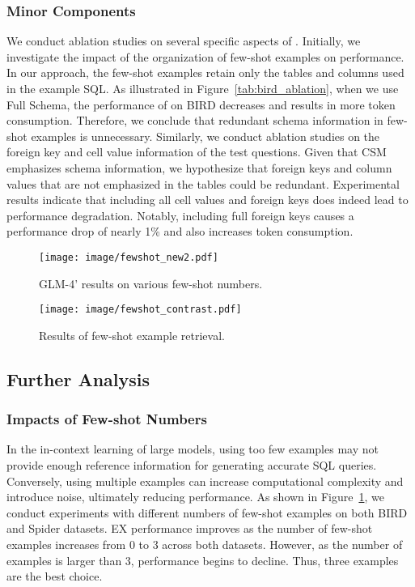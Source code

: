 

\subsubsection{Minor Components}
We conduct ablation studies on several specific aspects of \method. Initially, we investigate the impact of the organization of few-shot examples on performance. In our approach, the few-shot examples retain only the tables and columns used in the example SQL. 
As illustrated in Figure~\ref{tab:bird_ablation}, when we use Full Schema, the performance of \method on BIRD decreases and results in more token consumption. Therefore, we conclude that redundant schema information in few-shot examples is unnecessary.
Similarly, we conduct ablation studies on the foreign key and cell value information of the test questions. Given that CSM emphasizes schema information, we hypothesize that foreign keys and column values that are not emphasized in the tables could be redundant. 
Experimental results indicate that including all cell values and foreign keys does indeed lead to performance degradation. Notably, including full foreign keys causes a performance drop of nearly 1\% and also increases token consumption.

\begin{figure}[htbp]
    \centering
    \texttt{[image: image/fewshot\_new2.pdf]}
    \caption{GLM-4' results on various few-shot numbers.}
    \label{fig:fewshot_number}
    \vspace{-4mm}
\end{figure}

\begin{figure*}[htbp]
    \centering
    \texttt{[image: image/fewshot\_contrast.pdf]}
    \caption{Results of few-shot example retrieval.}
    \label{fig:aqp_case}
    \vspace{-4mm}
\end{figure*}

\subsection{Further Analysis}

\subsubsection{Impacts of Few-shot Numbers}

In the in-context learning of large models, using too few examples may not provide enough reference information for generating accurate SQL queries. Conversely, using multiple examples can increase computational complexity and introduce noise, ultimately reducing performance.
As shown in Figure~\ref{fig:fewshot_number}, we conduct experiments with different numbers of few-shot examples on both BIRD and Spider datasets. 
EX performance improves as the number of few-shot examples increases from 0 to 3 across both datasets. 
However, as the number of examples is larger than 3, performance begins to decline. Thus, three examples are the best choice.


